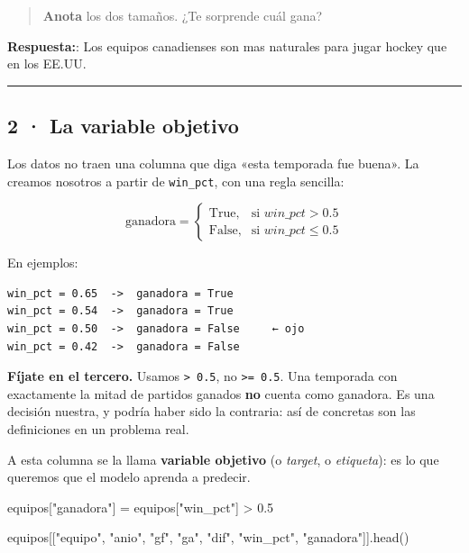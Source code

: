 \documentclass[
]{article}
\newenvironment{Shaded}{}{}
\newcommand{\FloatTok}[1]{\textcolor[rgb]{0.25,0.63,0.44}{#1}}
\newcommand{\NormalTok}[1]{#1}
\newcommand{\OperatorTok}[1]{\textcolor[rgb]{0.40,0.40,0.40}{#1}}
\newcommand{\StringTok}[1]{\textcolor[rgb]{0.25,0.44,0.63}{#1}}
\begin{document}
\protect{}\label{DxpAXQk-nYyL}
\begin{quote}
\textbf{Anota} los dos tamaños. ¿Te sorprende cuál gana?
\end{quote}

\textbf{Respuesta:}: Los equipos canadienses son mas naturales para
jugar hockey que en los EE.UU.

\protect{}\label{qzM2isTEnYyN}
\begin{center}\rule{0.5\linewidth}{0.5pt}\end{center}

\subsection{2 · La variable objetivo}\label{2--la-variable-objetivo}

Los datos no traen una columna que diga «esta temporada fue buena». La
creamos nosotros a partir de \texttt{win\_pct}, con una regla sencilla:

\[
\text{ganadora} =
\begin{cases}
\text{True}, & \text{si } win\_pct > 0.5 \\
\text{False}, & \text{si } win\_pct \le 0.5
\end{cases}
\]

En ejemplos:

\begin{verbatim}
win_pct = 0.65  ->  ganadora = True
win_pct = 0.54  ->  ganadora = True
win_pct = 0.50  ->  ganadora = False     ← ojo
win_pct = 0.42  ->  ganadora = False
\end{verbatim}

\textbf{Fíjate en el tercero.} Usamos \texttt{\textgreater{}\ 0.5}, no
\texttt{\textgreater{}=\ 0.5}. Una temporada con exactamente la mitad de
partidos ganados \textbf{no} cuenta como ganadora. Es una decisión
nuestra, y podría haber sido la contraria: así de concretas son las
definiciones en un problema real.

A esta columna se la llama \textbf{variable objetivo} (o \emph{target},
o \emph{etiqueta}): es lo que queremos que el modelo aprenda a predecir.

\protect{}\label{ImBdBYyynYyN}
\begin{Shaded}
\begin{Highlighting}[]
\NormalTok{equipos[}\StringTok{"ganadora"}\NormalTok{] }\OperatorTok{=}\NormalTok{ equipos[}\StringTok{"win\_pct"}\NormalTok{] }\OperatorTok{\textgreater{}} \FloatTok{0.5}

\NormalTok{equipos[[}\StringTok{"equipo"}\NormalTok{, }\StringTok{"anio"}\NormalTok{, }\StringTok{"gf"}\NormalTok{, }\StringTok{"ga"}\NormalTok{, }\StringTok{"dif"}\NormalTok{, }\StringTok{"win\_pct"}\NormalTok{, }\StringTok{"ganadora"}\NormalTok{]].head()}
\end{Highlighting}
\end{Shaded}
\end{document}
